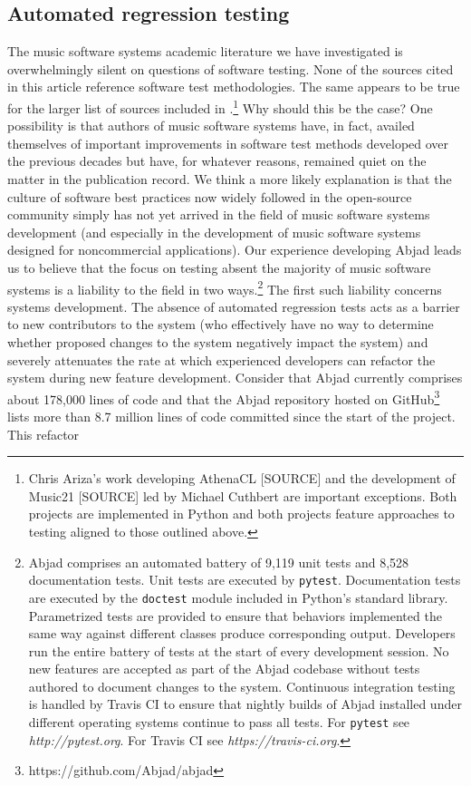 \documentclass{article}
\begin{document}
\subsection{Automated regression testing}

The music software systems academic literature we have investigated is overwhelmingly silent on questions of software testing. None of the sources cited in this article reference software test methodologies. The same appears to be true for the larger list of sources included in \cite{Trevino:2013aa}.\footnote{Chris Ariza's work developing AthenaCL [SOURCE] and the development of Music21 [SOURCE] led by Michael Cuthbert are important exceptions. Both projects are implemented in Python and both projects feature approaches to testing aligned to those outlined above.} Why should this be the case? One possibility is that authors of music software systems have, in fact, availed themselves of important improvements in software test methods developed over the previous decades but have, for whatever reasons, remained quiet on the matter in the publication record. We think a more likely explanation is that the culture of software best practices now widely followed in the open-source community simply has not yet arrived in the field of music software systems development (and especially in the development of music software systems designed for noncommercial applications). Our experience developing Abjad leads us to believe that the focus on testing absent the majority of music software systems is a liability to the field in two ways.\footnote{Abjad comprises an automated battery of 9,119 unit tests and 8,528 documentation tests. Unit tests are executed by \texttt{pytest}. Documentation tests are executed by the \texttt{doctest} module included in Python's standard library. Parametrized tests are provided to ensure that behaviors implemented the same way against different classes produce corresponding output. Developers run the entire battery of tests at the start of every development session. No new features are accepted as part of the Abjad codebase without tests authored to document changes to the system. Continuous integration testing is handled by Travis CI to ensure that nightly builds of Abjad installed under different operating systems continue to pass all tests. For \texttt{pytest} see \textit{http://pytest.org}. For Travis CI see \textit{https://travis-ci.org}.}
The first such liability concerns systems development. The absence of automated regression tests acts as a barrier to new contributors to the system (who effectively have no way to determine whether proposed changes to the system negatively impact the system) and severely attenuates the rate at which experienced developers can refactor the system during new feature development. Consider that Abjad currently comprises about 178,000 lines of code and that the Abjad repository hosted on GitHub\footnote{https://github.com/Abjad/abjad} lists more than 8.7 million lines of code committed since the start of the project. This refactor
\end{document}
